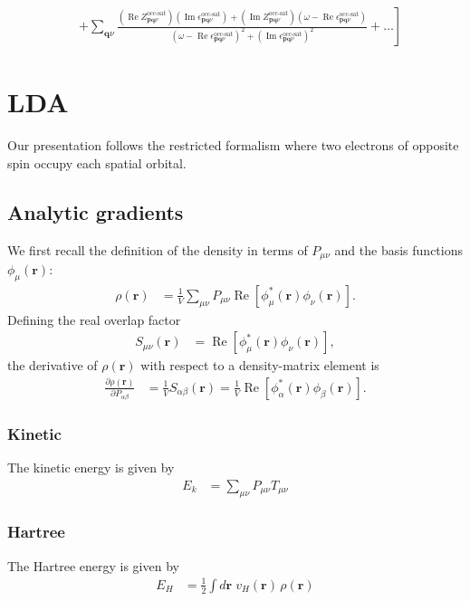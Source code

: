 \begin{align}
& \left. + \sum_{\bm{q}\nu} \frac{\left(\operatorname{Re} Z_{\bm{p}\bm{q}\nu}^{\text{occ-sat}}\right)\left(\operatorname{Im} \epsilon_{\bm{p}\bm{q}\nu}^{\text{occ-sat}}\right) + \left(\operatorname{Im} Z_{\bm{p}\bm{q}\nu}^{\text{occ-sat}}\right)\left(\omega - \operatorname{Re} \epsilon_{\bm{p}\bm{q}\nu}^{\text{occ-sat}}\right)}{\left(\omega - \operatorname{Re} \epsilon_{\bm{p}\bm{q}\nu}^{\text{occ-sat}}\right)^2 + \left(\operatorname{Im} \epsilon_{\bm{p}\bm{q}\nu}^{\text{occ-sat}}\right)^2} + \ldots \right]
\end{align}
\section{LDA}
Our presentation follows the restricted formalism where two electrons of opposite spin occupy each spatial orbital.
\subsection{Analytic gradients}

We first recall the definition of the density in terms of $P_{\mu\nu}$ and the basis functions $\phi_\mu(\mathbf r)$:
\begin{align}
  \rho(\mathbf r)
  &= \frac{1}{V}\sum_{\mu\nu} P_{\mu\nu}
      \operatorname{Re}\!\left[\phi_\mu^*(\mathbf r)\phi_\nu(\mathbf r)\right].
\end{align}
Defining the real overlap factor
\begin{align}
  S_{\mu\nu}(\mathbf r)
  &= \operatorname{Re}\!\left[\phi_\mu^*(\mathbf r)\phi_\nu(\mathbf r)\right],
\end{align}
the derivative of $\rho(\mathbf r)$ with respect to a density-matrix
element is
\begin{align}
  \frac{\partial \rho(\mathbf r)}{\partial P_{\alpha\beta}}
  &= \frac{1}{V} S_{\alpha\beta}(\mathbf r)
   = \frac{1}{V}\operatorname{Re}\!\left[\phi_\alpha^*(\mathbf r)\phi_\beta(\mathbf r)\right].
\end{align}
\subsubsection{Kinetic}
The kinetic energy is given by
\begin{align}
  E_k
  &= \sum_{\mu\nu} P_{\mu\nu} T_{\mu\nu}
\end{align}
\subsubsection{Hartree}
The Hartree energy is given by
\begin{align}
  E_H
  &= \frac{1}{2}\int d\mathbf r\; v_H(\mathbf r)\,\rho(\mathbf r) \\
\end{align}
